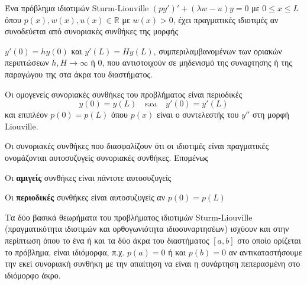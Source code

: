 \begin{thm}
  Ένα πρόβλημα ιδιοτιμών Sturm-Liouville $ (py')' + (\lambda w-u)y=0 $ με $ 0 \leq x \leq
  L$ όπου $ p(x), w(x), u(x) \in \mathbb{R} $ με $w(x)>0$, έχει πραγματικές ιδιοτιμές 
  αν συνοδεύεται από συνοριακές συνθήκες της μορφής 
  \begin{myitemize}
    \item $ y'(0) = h y(0) $ και $ y'(L) = Hy(L) $, συμπεριλαμβανομένων των οριακών 
      περιπτώσεων $ h,H \to \infty $ ή $ 0 $, που αντιστοιχούν σε μηδενισμό της 
      συναϱτησης ή της παραγώγου της στα άκρα του διαστήματος.
    \item Οι ομογενείς συνοριακές συνθήκες του προβλήματος είναι περιοδικές 
      \[
        y(0)=y(L) \quad \text{και} \quad y'(0) = y'(L)
      \] 
      και επιπλέον $ p(0)=p(L) $ όπου $ p(x) $ είναι ο συντελεστής του $ y'' $ 
      στη μορφή Liouville.
  \end{myitemize}
\end{thm}

\begin{rem}
  Οι συνοριακές συνθήκες που διασφαλίζουν ότι οι ιδιοτιμές είναι πραγματικές ονομάζονται 
  αυτοσυζυγείς συνοριακές συνθήκες. Επομένως
  \begin{myitemize}
    \item Οι \textbf{αμιγείς} συνθήκες είναι πάντοτε αυτοσυζυγείς
    \item Οι \textbf{περιοδικές} συνθήκες είναι αυτοσυζυγείς αν $ p(0)=p(L) $
  \end{myitemize}
\end{rem}

\begin{prop}
  Τα δύο βασικά θεωρήματα του προβλήματος ιδιοτιμών Sturm-Liouville (πραγματικότητα
  ιδιοτιμών και ορθογωνιότητα ιδιοσυναρτησέων) ισχύουν και στην περίπτωση όπου το 
  ένα ή και τα δύο άκρα του διαστήματος $ [a,b] $ στο οποίο ορίζεται το πρόβλημα, 
  είναι ιδιόμορφα, π.χ. $ p(a)=0 $ ή και $ p(b)=0 $ αν αντικαταστήσουμε την εκεί 
  συνοριακή συνθήκη με την απαίτηση να είναι η συνάρτηση πεπερασμένη στο ιδιόμορφο άκρο.
  \end{prop}



